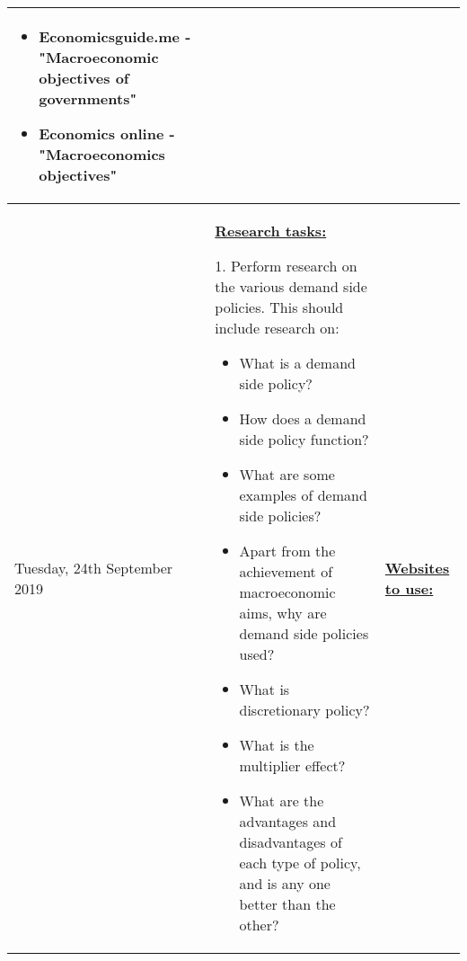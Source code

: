 \documentclass[12pt, a4paper]{article}
\newlength\combinedlength
\begin{document}
\begin{landscape}
\begin{longtable}{|m{5cm}|m{5cm}|m{5cm}|m{10.31cm}|}
				\begin{itemize}
					\item Economicsguide.me - "Macroeconomic objectives of governments"
					\item Economics online - "Macroeconomics objectives"
				\end{itemize}
		
					\\
			\hline
			
				
						Tuesday, 24th September 2019 &  \multicolumn{2}{m{\combinedlength}|}{
				
				\textbf{\underline{Research tasks:}}
				\newline
				
				1. Perform research on the various demand side policies. This should include research on:
				
				\begin{itemize}
					\item What is a demand side policy?
					\item How does a demand side policy function?
					\item What are some examples of demand side policies?
					\item Apart from the achievement of macroeconomic aims, why are demand side policies used?
					\item What is discretionary policy?
					\item What is the multiplier effect?
					\item What are the advantages and disadvantages of each type of policy, and is any one better than the other?
				\end{itemize}
			} &
		
			 	\textbf{\underline{Websites to use:}}
				\newline
			

\end{longtable}
\end{landscape}
\end{document}
